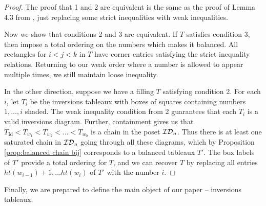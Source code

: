 \documentclass{article}
\theoremstyle{definition}
\begin{document}
\begin{proof}
  The proof that 1 and 2 are equivalent is the same as the proof of Lemma 4.3 from \cite{EG}, just replacing some strict inequalities with weak inequalities. 
  
   Now we show that conditions 2 and 3 are equivalent. If $T$ satisfies condition 3, then impose a total ordering on the numbers which makes it balanced. All rectangles for $i<j<k$ in $T$ have corner entries satisfying the strict inequality relations. Returning to our weak order where a number is allowed to appear multiple times, we still maintain loose inequality.

   In the other direction, suppose we have a filling $T$ satisfying condition 2. For each $i$, let $T_i$ be the inversions tableaux with boxes of squares containing numbers $1, \dots, i$ shaded. The weak inequality condition from 2 guarantees that each $T_i$ is a valid inversions diagram. Further, containment gives us that $T_{\text{Id}} < T_{w_1} < T_{w_2} < \dots < T_{w_0}$ is a chain in the poset $\mathcal{ID}_{n}$. Thus there is at least one saturated chain in $\mathcal{ID}_{n}$ going through all these diagrams, which by Proposition \ref{prop:balanced chain bij} corresponds to a balanced tableaux $T'$. The box labels of $T'$ provide a total ordering for  $T$, and we can recover $T$ by replacing all entries $ht(w_{i-1})+1, \dots ht(w_i)$ of $T'$ with the number $i$. 

   
\end{proof}



Finally, we are prepared to define the main object of our paper -- inversions tableaux.
\end{document}
